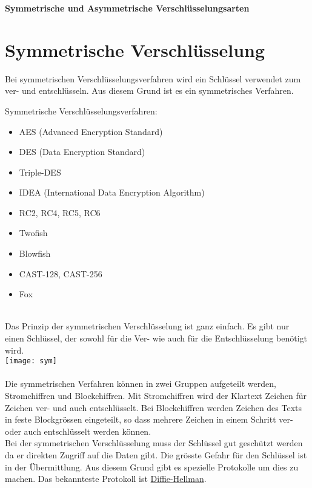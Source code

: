 \documentclass{article}
\begin{document}
\huge \textbf{Symmetrische und Asymmetrische Verschlüsselungsarten} \normalsize
\section*{Symmetrische Verschlüsselung}
Bei symmetrischen Verschlüsselungsverfahren wird ein Schlüssel verwendet zum ver- und entschlüsseln. Aus diesem Grund ist es ein symmetrisches Verfahren.

Symmetrische Verschlüsselungsverfahren:

\begin{itemize}
    \item AES (Advanced Encryption Standard)
    \item DES (Data Encryption Standard)
    \item Triple-DES
    \item IDEA (International Data Encryption Algorithm)
    \item RC2, RC4, RC5, RC6
    \item Twofish
    \item Blowfish
    \item CAST-128, CAST-256
    \item Fox
\end{itemize} \cite{1} \\

Das Prinzip der symmetrischen Verschlüsselung ist ganz einfach. Es gibt nur einen Schlüssel, der sowohl für die Ver- wie auch für die Entschlüsselung benötigt wird. \\
\texttt{[image: sym]} \\
\cite{3}
\\

Die symmetrischen Verfahren können in zwei Gruppen aufgeteilt werden, Stromchiffren und Blockchiffren. Mit Stromchiffren wird der Klartext Zeichen für Zeichen ver- und auch entschlüsselt. Bei Blockchiffren werden Zeichen des Texts in feste Blockgrössen eingeteilt, so dass mehrere Zeichen in einem Schritt ver- oder auch entschlüsselt werden können. \\

Bei der symmetrischen Verschlüsselung muss der Schlüssel gut geschützt werden da er direkten Zugriff auf die Daten gibt. Die grösste Gefahr für den Schlüssel ist in der Übermittlung. Aus diesem Grund gibt es spezielle Protokolle um dies zu machen. Das bekannteste Protokoll ist \href{https://www.youtube.com/watch?v=NmM9HA2MQGI}{Diffie-Hellman}. \\
\end{document}

